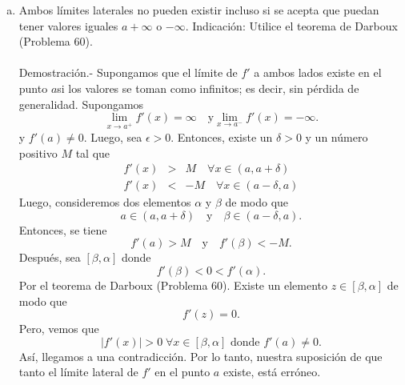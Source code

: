 \begin{enumerate}[\bfseries 1.]
\begin{enumerate}[(a)]
\begin{enumerate}
		\end{enumerate}


	    \item Ambos límites laterales no pueden existir incluso si se acepta que puedan tener valores iguales $a+\infty$ o $-\infty$. Indicación: Utilice el teorema de Darboux (Problema 60).\\\\
		Demostración.-\; Supongamos que el límite de $f'$ a ambos lados existe en el punto $a$si los valores se toman como infinitos; es decir, sin pérdida de generalidad. Supongamos
		$$\lim_{x\to a^+}f'(x)=\infty\quad \mbox{y} \lim_{x\to a^-}f'(x)=-\infty.$$
		y $f'(a)\neq 0$. Luego, sea $\epsilon>0$. Entonces, existe un $\delta>0$ y un número positivo $M$ tal que
		$$
		\begin{array}{rcr}
		    f'(x)&>&M \quad \forall x\in (a,a+\delta)\\
		    f'(x)&<&-M \quad \forall x\in (a-\delta,a)
		\end{array}
		$$
		Luego, consideremos dos elementos $\alpha$ y $\beta$ de modo que
		$$a\in(a,a+\delta)\quad \mbox{y}\quad \beta\in (a-\delta,a).$$
		Entonces, se tiene
		$$f'(a)>M\quad \mbox{y}\quad f'(\beta)<-M.$$
		Después, sea $[\beta,\alpha]$ donde
		$$f'(\beta)<0<f'(\alpha).$$
		Por el teorema de Darboux (Problema 60). Existe un elemento $z \in [\beta,\alpha]$ de modo que
		$$f'(z)=0.$$
		Pero, vemos que
		$$\left|f'(x)\right|>0\; \forall x\in [\beta,\alpha] \mbox{ donde } f'(a)\neq 0.$$
		Así, llegamos a una contradicción. Por lo tanto, nuestra suposición de que tanto el límite lateral de $f'$ en el punto $a$ existe, está erróneo. \\\\

	\end{enumerate}


\end{enumerate}
